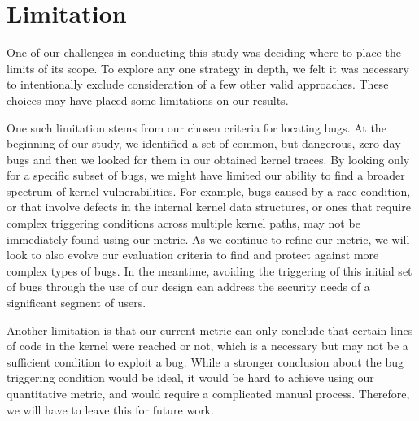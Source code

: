 \section{Limitation} 
\label{sec.limitation}

One of our challenges in conducting this study was deciding where to place the
limits of its scope.  To explore any one strategy
in depth, we felt it was necessary to intentionally exclude consideration of
a few other valid approaches. These choices may have placed some limitations on our results.

One such limitation stems from our chosen criteria for locating
bugs. At the beginning
of our study, we identified a set of common, but dangerous, zero-day bugs
and then we looked for them in our obtained kernel traces. By looking only
for a specific subset of bugs, we might have limited our
ability to find a broader spectrum of kernel vulnerabilities. For example, bugs
caused by a race condition, or that involve defects in the internal kernel data
structures, or ones that require complex triggering conditions across multiple kernel
paths, may not be immediately found using our metric. As we continue to refine
our metric, we will look to also evolve our evaluation
criteria to find and protect against more complex types of bugs. 
In the meantime, avoiding the triggering of this initial set of bugs
through the use of our \lip design can address the security
needs of a significant segment of users. 

Another limitation is that our current metric can only conclude that certain lines of code in 
the kernel were reached or not, which is a necessary but may not be a sufficient condition 
to exploit a bug. While a stronger conclusion about the bug triggering condition would be ideal, 
it would be hard to achieve using our quantitative metric, and would require a complicated manual process. 
Therefore, we will have to leave this for future work.  


